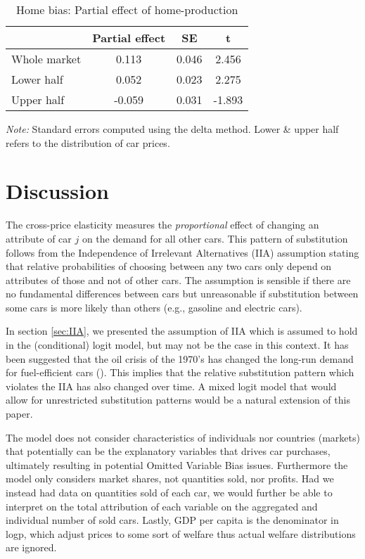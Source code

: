 \documentclass[11pt]{article}
\begin{document}
\begin{table}[H]
    \centering
    \caption{Home bias: Partial effect of home-production}
    \begin{threeparttable}
    \begin{tabular}{lccc}
    \toprule
    {} &  Partial effect &     SE &      t \\
    \midrule
    Whole market &           0.113 &  0.046 &  2.456 \\
    Lower half   &           0.052 &  0.023 &  2.275 \\
    Upper half   &          -0.059 &  0.031 & -1.893 \\
    \bottomrule
    \end{tabular}
                \begin{tablenotes}
                \footnotesize \textit{Note:} Standard errors computed using the delta method. Lower \& upper half refers to the distribution of car prices.
                \end{tablenotes}
        \label{tab:price_partial_effect}
    \end{threeparttable}
\end{table}

\section{Discussion}
The cross-price elasticity measures the \textit{proportional} effect of changing an attribute of car $j$ on the demand for all other cars. This pattern of substitution follows from the Independence of Irrelevant Alternatives (IIA) assumption stating that relative probabilities of choosing between any two cars only depend on attributes of those and not of other cars. The assumption is sensible if there are no fundamental differences between cars but unreasonable if substitution between some cars is more likely than others (e.g., gasoline and electric cars).

In section \ref{sec:IIA}, we presented the assumption of IIA which is assumed to hold in the (conditional) logit model, but may not be the case in this context. It has been suggested that the oil crisis of the 1970's has changed the long-run demand for fuel-efficient cars (\cite{bonilla2009demand}). This implies that the relative substitution pattern which violates the IIA has also changed over time. A mixed logit model that would allow for unrestricted substitution patterns would be a natural extension of this paper.

The model does not consider characteristics of individuals nor countries (markets) that potentially can be the explanatory variables that drives car purchases, ultimately resulting in potential Omitted Variable Bias issues. Furthermore the model only considers market shares, not quantities sold, nor profits. Had we instead had data on quantities sold of each car, we would further be able to interpret on the total attribution of each variable on the aggregated and individual number of sold cars. Lastly, GDP per capita is the denominator in logp, which adjust prices to some sort of welfare thus actual welfare distributions are ignored.
\end{document}
